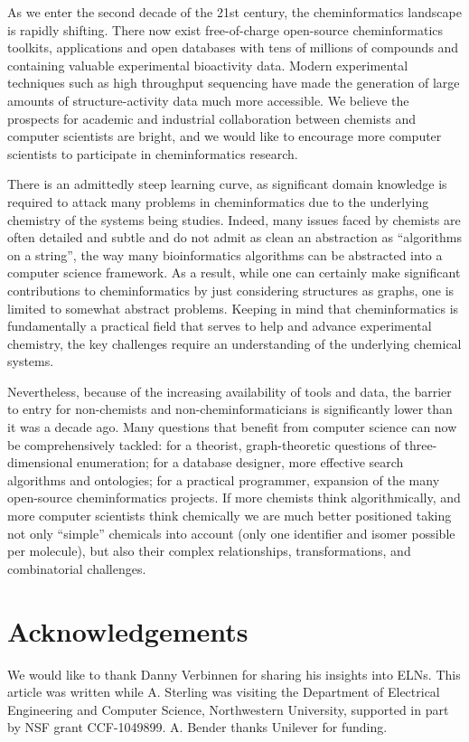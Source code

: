 \documentclass{sig-alternate}
\begin{document}
As we enter the second decade of the 21st century, the cheminformatics
landscape is rapidly shifting.  There now exist free-of-charge
open-source cheminformatics toolkits, applications and open databases
with tens of millions of compounds and containing valuable
experimental bioactivity data. Modern experimental techniques such as
high throughput sequencing have made the generation of large amounts
of structure-activity data much more accessible.  We believe the
prospects for academic and industrial collaboration between chemists
and computer scientists are bright, and we would like to encourage
more computer scientists to participate in cheminformatics research.

There is an admittedly steep learning curve, as significant domain
knowledge is required to attack many problems in cheminformatics due
to the underlying chemistry of the systems being studies. Indeed, many
issues faced by chemists are often detailed and subtle and do not
admit as clean an abstraction as ``algorithms on a string'', the way
many bioinformatics algorithms can be abstracted into a computer
science framework.  As a result, while one can certainly make
significant contributions to cheminformatics by just considering
structures as graphs, one is limited to somewhat abstract
problems. Keeping in mind that cheminformatics is fundamentally a
practical field that serves to help and advance experimental
chemistry, the key challenges require an understanding of the
underlying chemical systems. 

Nevertheless, because of the increasing availability of tools and
data, the barrier to entry for non-chemists and non-cheminformaticians
is significantly lower than it was a decade ago. Many questions that benefit from computer
science can now be comprehensively tackled: for a theorist,
graph-theoretic questions of three-dimensional enumeration; for a
database designer, more effective search algorithms and ontologies;
for a practical programmer, expansion of the many open-source
cheminformatics projects.  If more chemists think algorithmically, and
more computer scientists think chemically we are much better
positioned taking not only ``simple'' chemicals into account (only one
identifier and isomer possible per molecule), but also their complex
relationships, transformations, and combinatorial challenges.

\section{Acknowledgements}
We would like to thank Danny Verbinnen for sharing his insights into
ELNs.  This article was written while A. Sterling was visiting the
Department of Electrical Engineering and Computer Science,
Northwestern University, supported in part by NSF grant
CCF-1049899. A. Bender thanks Unilever for funding.
\end{document}
